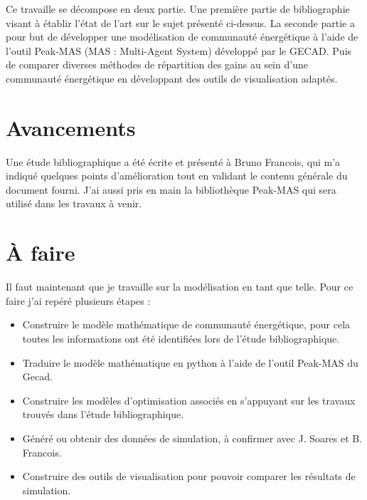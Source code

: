 \documentclass[a4paper,10pt]{article}
\begin{document}
Ce travaille se décompose en deux partie. Une première partie de bibliographie visant à établir l'état de l'art sur le sujet présenté ci-dessus. La seconde partie a pour but de développer une modélisation de communauté énergétique à l'aide de l'outil Peak-MAS (MAS : Multi-Agent System) développé par le GECAD. Puis de comparer diverses méthodes de répartition des gains au sein d'une communauté énergétique en développant des outils de visualisation adaptés.

\section*{Avancements}
Une étude bibliographique a été écrite et présenté à Bruno Francois, qui m'a indiqué quelques points d'amélioration tout en validant le contenu générale du document fourni. J'ai aussi pris en main la bibliothèque Peak-MAS qui sera utilisé dans les travaux à venir.

\section*{À faire}
Il faut maintenant que je travaille sur la modélisation en tant que telle. Pour ce faire j'ai repéré plusieurs étapes : 
\begin{itemize}
\item Construire le modèle mathématique de communauté énergétique, pour cela toutes les informations ont été identifiées lors de l'étude bibliographique.
\item Traduire le modèle mathématique en python à l'aide de l'outil Peak-MAS du Gecad.
\item Construire les modèles d'optimisation associés en s'appuyant sur les travaux trouvés dans l'étude bibliographique.
\item Généré ou obtenir des données de simulation, à confirmer avec J. Soares et B. Francois.
\item Construire des outils de visualisation pour pouvoir comparer les résultats de simulation.
\end{itemize}
\thispagestyle{empty}
\end{document}
